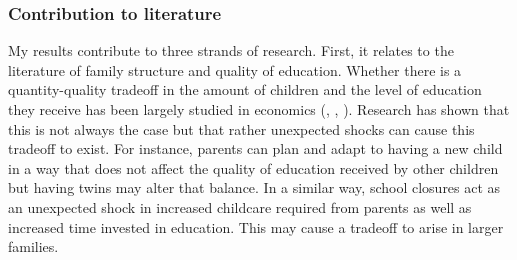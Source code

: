 

\subsubsection{Contribution to literature}

My results contribute to three strands of research. First, it relates to the literature of family structure and quality of education. Whether there is a quantity-quality tradeoff in the amount of children and the level of education they receive has been largely studied in economics (\cite{becker_child_1976}, \cite{black_more_2005}, \cite{black_small_2010}). Research has shown that this is not always the case but that rather unexpected shocks can cause this tradeoff to exist. For instance, parents can plan and adapt to having a new child in a way that does not affect the quality of education received by other children but having twins may alter that balance. In a similar way, school closures act as an unexpected shock in increased childcare required from parents as well as increased time invested in education. This may cause a tradeoff to arise in larger families.

